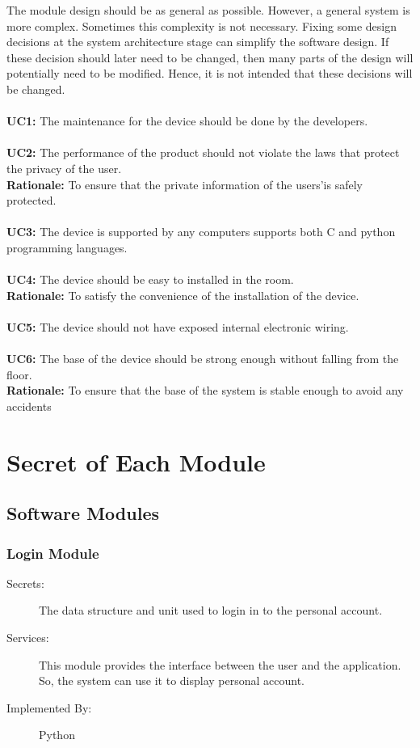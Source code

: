 \documentclass[12pt, titlepage]{article}
\begin{document}
The module design should be as general as possible. However, a general system is
more complex. Sometimes this complexity is not necessary. Fixing some design
decisions at the system architecture stage can simplify the software design. If
these decision should later need to be changed, then many parts of the design
will potentially need to be modified. Hence, it is not intended that these
decisions will be changed.\\\\
\textbf{UC1:} The maintenance for the device should be done by the developers.\\\\
\textbf{UC2:} The performance of the product should not violate the laws that protect the privacy of the user. \\
\textbf{Rationale:} To ensure that the private information of the users’is safely protected.\\\\
\textbf{UC3:} The device is supported by any computers supports both C and python programming languages.\\\\
\textbf{UC4:} The device should be easy to installed in the room.\\
\textbf{Rationale:} To satisfy the convenience of the installation of the device.\\\\
\textbf{UC5:} The device should not have exposed internal electronic wiring.\\\\
\textbf{UC6:} The base of the device should be strong enough without falling from the floor.\\
\textbf{Rationale:} To ensure that the base of the system is stable enough to avoid any accidents\\


\section{Secret of Each Module} 
\subsection{Software Modules}
\subsubsection{Login Module}
\begin{description}
\item[Secrets:]The data structure and unit used to login in to the personal account.
\item[Services:]This module provides the interface between the user and the application. So, the system can use it to display personal account.
\item[Implemented By:] Python
\end{description}
\end{document}
